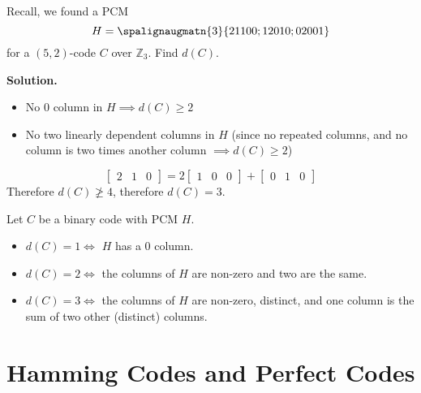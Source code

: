 \begin{exbox}
    \begin{example}
        Recall, we found a PCM
        \[ H=\spalignaugmatn{3}{
                2 1 1 0 0;
                1 2 0 1 0;
                0 2 0 0 1} \]
        for a $ (5,2) $-code $ C $ over $ \mathbb{Z}_3 $. Find $ d(C) $.

        \textbf{Solution.}
        \begin{itemize}
            \item No $ 0 $ column in $ H\implies d(C)\geqslant 2 $
            \item No two linearly dependent columns in $ H $ (since
                  no repeated columns, and no column is two times another
                  column $ \implies d(C)\geqslant 2 $)
        \end{itemize}
        \[ \begin{bmatrix} 2 & 1 & 0 \end{bmatrix}
            = 2\begin{bmatrix} 1 & 0 & 0 \end{bmatrix}
            + \begin{bmatrix} 0 & 1 & 0 \end{bmatrix} \]
        Therefore $ d(C)\ngeqslant 4 $, therefore $ d(C)=3 $.
    \end{example}
\end{exbox}

\begin{exbox}
    \begin{example}
        Let $ C $ be a binary code with PCM $ H $.
        \begin{itemize}
            \item $ d(C)=1\iff  $ $ H $ has a $ 0 $ column.
            \item $ d(C)=2\iff $ the columns of $ H $ are non-zero and two are
                  the same.
            \item $ d(C)=3\iff $ the columns of $ H $ are non-zero, distinct, and one
                  column is the sum of two other (distinct) columns.
        \end{itemize}
    \end{example}
\end{exbox}

\section{Hamming Codes and Perfect Codes}

